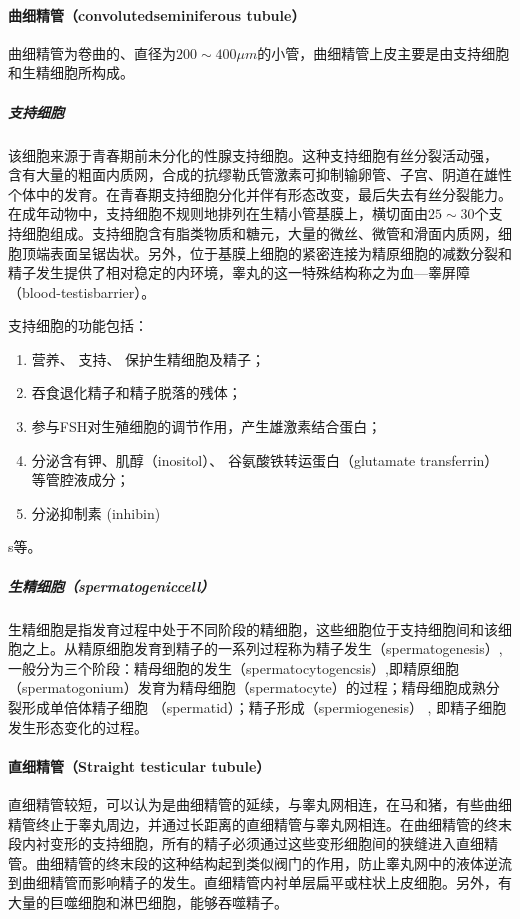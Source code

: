 \paragraph{曲细精管（convolutedseminiferous tubule）}

曲细精管为卷曲的、直径为$ 200 \sim 400\mu m $的小管，曲细精管上皮主要是由支持细胞和生精细胞所构成。

\subparagraph{支持细胞}
该细胞来源于青春期前未分化的性腺支持细胞。这种支持细胞有丝分裂活动强， 含有大量的粗面内质网，合成的抗缪勒氏管激素可抑制输卵管、子宫、阴道在雄性个体中的发育。在青春期支持细胞分化并伴有形态改变，最后失去有丝分裂能力。在成年动物中，支持细胞不规则地排列在生精小管基膜上，横切面由$ 25\sim 30 $个支持细胞组成。支持细胞含有脂类物质和糖元，大量的微丝、微管和滑面内质网，细胞顶端表面呈锯齿状。另外，位于基膜上细胞的紧密连接为精原细胞的减数分裂和精子发生提供了相对稳定的内环境，睾丸的这一特殊结构称之为血---睾屏障（blood-testisbarrier）。

支持细胞的功能包括： 
\begin{enumerate}
\item 营养、 支持、 保护生精细胞及精子；
\item 吞食退化精子和精子脱落的残体；
\item 参与FSH对生殖细胞的调节作用，产生雄激素结合蛋白；
\item 分泌含有钾、肌醇（inositol）、 谷氨酸铁转运蛋白（glutamate transferrin）等管腔液成分；
\item 分泌抑制素 (inhibin) 
\end{enumerate}s等。

\subparagraph{生精细胞（spermatogeniccell）}

生精细胞是指发育过程中处于不同阶段的精细胞，这些细胞位于支持细胞间和该细胞之上。从精原细胞发育到精子的一系列过程称为精子发生（spermatogenesis）, 一般分为三个阶段：精母细胞的发生（spermatocytogencsis）,即精原细胞（spermatogonium）发育为精母细胞（spermatocyte）的过程；精母细胞成熟分裂形成单倍体精子细胞 （spermatid）；精子形成（spermiogenesis） , 即精子细胞发生形态变化的过程。

\paragraph{直细精管（Straight testicular tubule）}

直细精管较短，可以认为是曲细精管的延续，与睾丸网相连，在马和猪，有些曲细精管终止于睾丸周边，并通过长距离的直细精管与睾丸网相连。在曲细精管的终末段内衬变形的支持细胞，所有的精子必须通过这些变形细胞间的狭缝进入直细精管。曲细精管的终末段的这种结构起到类似阀门的作用，防止睾丸网中的液体逆流到曲细精管而影响精子的发生。直细精管内衬单层扁平或柱状上皮细胞。另外，有大量的巨噬细胞和淋巴细胞，能够吞噬精子。

